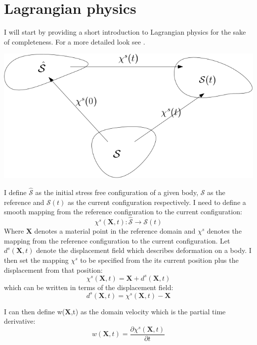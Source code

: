 \section{Lagrangian physics}
I will start by providing a short introduction to Lagrangian physics for the sake of completeness. For a more detailed look see \cite{Holzapfel2000}.
\begin{center}
\includegraphics[scale=0.4]{continuum_mapping.png}
\end{center}
I define $ \hat{\mathcal{S}}$ as the initial stress free configuration of a given body, $\mathcal{S}$ as the reference and $\mathcal{S}(t)$ as the current configuration respectively.
I need to define a smooth mapping from the reference configuration to the current configuration:
\begin{equation}
\chi^s(\textbf{X},t) : \hat{\mathcal{S}} \rightarrow \mathcal{S}(t)     
\end{equation}
Where $\textbf{X}$ denotes a material point in the reference domain and $\chi^s$ denotes the mapping from the reference configuration to the current configuration. Let $d^s(\textbf{X},t)$ denote the displacement field which describes deformation on a body. I then set the mapping $\chi^s$   to be specified from the its current position plus the displacement from that position:
\begin{equation} \label{eq:chi}
 \chi^s(\textbf{X},t) = \textbf{X}  + d^s(\textbf{X} ,t) 
\end{equation}
which can be written in terms of the displacement field:
\begin{equation}
 d^s(\textbf{X},t) = \chi^s(\textbf{X},t) -\textbf{X}   
\end{equation}

I can then define w(\textbf{X},t) as  the domain velocity which is the partial time derivative: 
\begin{equation}
 w(\textbf{X},t) = \frac{\partial \chi^s(\textbf{X},t)}{\partial t}   
\end{equation}

